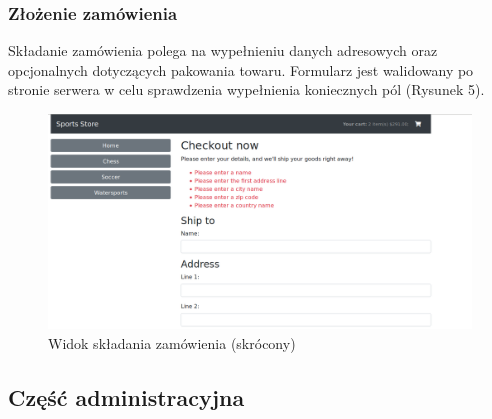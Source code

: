 \documentclass[a4paper,10pt]{article}
\begin{document}
\subsubsection{Złożenie zamówienia}
Składanie zamówienia polega na wypełnieniu danych adresowych oraz opcjonalnych dotyczących pakowania towaru. Formularz jest walidowany po stronie serwera w celu sprawdzenia wypełnienia koniecznych pól (Rysunek 5).
\begin{figure}
 \centering
 \includegraphics[width=\linewidth]{Images/checkout.png}
 \caption{Widok składania zamówienia (skrócony)}
 \label{rys:}
\end{figure}

\subsection{Część administracyjna}
\end{document}
